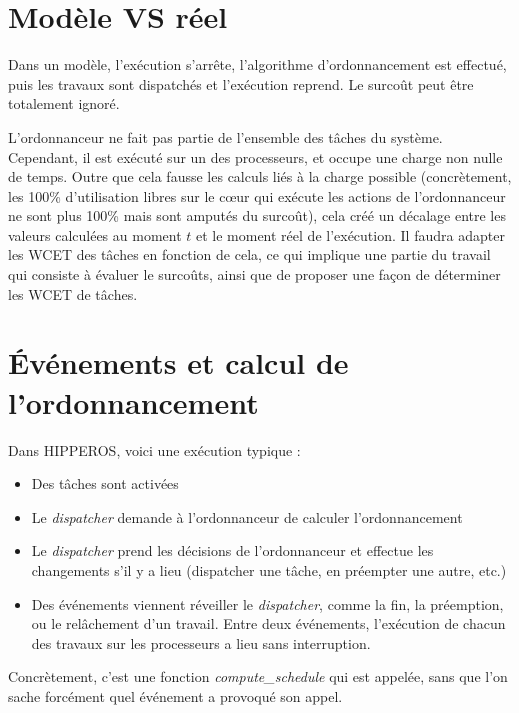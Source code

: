 	\section{Modèle VS réel}
	
		Dans un modèle, l'exécution s'arrête, l'algorithme d'ordonnancement est effectué, 
		puis les travaux sont dispatchés et l'exécution reprend.
		Le surcoût peut être totalement ignoré.
		\newline
		
		L'ordonnanceur ne fait pas partie de l'ensemble des tâches du système. Cependant, il est exécuté 
		sur un des processeurs, et occupe une charge non nulle de temps. Outre que cela fausse les calculs 
		liés à la charge possible (concrètement, les 100\% d'utilisation libres sur le cœur qui exécute 
		les actions de l'ordonnanceur ne sont plus 100\% mais sont amputés du surcoût), 
		cela créé un décalage entre les valeurs calculées au moment $t$ et le moment réel de l'exécution.
		Il faudra adapter les WCET des tâches en fonction de cela, ce qui implique 
		une partie du travail qui consiste à évaluer le surcoûts, ainsi que de proposer une 
		façon de déterminer les WCET de tâches.\newline
		
	\section{Événements et calcul de l'ordonnancement}

		Dans HIPPEROS, voici une exécution typique :
		\begin{itemize}
			\setlength\itemsep{0.1em}
			\item Des tâches sont activées
			\item Le \textit{dispatcher} demande à l'ordonnanceur de calculer l'ordonnancement
			\item Le \textit{dispatcher} prend les décisions de l'ordonnanceur et effectue les changements 
			s'il y a lieu (dispatcher une tâche, en préempter une autre, etc.)
			\item Des événements viennent réveiller le \textit{dispatcher}, comme la fin, 
			la préemption, ou le relâchement d'un travail. Entre deux événements, l'exécution 
			de chacun des travaux sur les processeurs a lieu sans interruption.
		\end{itemize}
		
		Concrètement, c'est une fonction \textit{compute\_schedule} qui est appelée, sans 
		que l'on sache forcément quel événement a provoqué son appel. \newline
		
